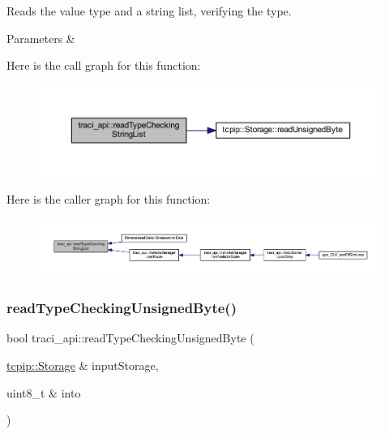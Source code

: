 Reads the value type and a string list, verifying the type. 


\begin{DoxyParams}{Parameters}
{\em } & \\
\hline
\end{DoxyParams}
Here is the call graph for this function\+:
\nopagebreak
\begin{figure}[H]
\begin{center}
\leavevmode
\includegraphics[width=350pt]{namespacetraci__api_aa16305c07ac5f8221d9099f2e3a7531c_cgraph}
\end{center}
\end{figure}
Here is the caller graph for this function\+:
\nopagebreak
\begin{figure}[H]
\begin{center}
\leavevmode
\includegraphics[width=350pt]{namespacetraci__api_aa16305c07ac5f8221d9099f2e3a7531c_icgraph}
\end{center}
\end{figure}
\mbox{\label{namespacetraci__api_ac95893093cb3b220faafd74ce62abba3}} 
\subsubsection{\texorpdfstring{read\+Type\+Checking\+Unsigned\+Byte()}{readTypeCheckingUnsignedByte()}}
{\footnotesize\ttfamily bool traci\+\_\+api\+::read\+Type\+Checking\+Unsigned\+Byte (\begin{DoxyParamCaption}\item[{\hyperlink{classtcpip_1_1_storage}{tcpip\+::\+Storage} \&}]{input\+Storage,  }\item[{uint8\+\_\+t \&}]{into }\end{DoxyParamCaption})}



